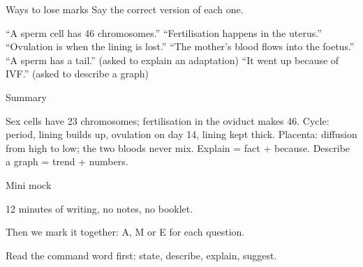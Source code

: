 \documentclass[aspectratio=169,11pt,xcolor=table]{beamer}
\begin{document}
\begin{frame}{Ways to lose marks}
\relax
Say the correct version of each one.\par\vspace{1mm}
 ``A sperm cell has 46 chromosomes.''
 ``Fertilisation happens in the uterus.''
 ``Ovulation is when the lining is lost.''
 ``The mother's blood flows into the foetus.''
 ``A sperm has a tail.'' (asked to explain an adaptation)
 ``It went up because of IVF.'' (asked to describe a graph)
\end{frame}

\begin{frame}{Summary}
\relax
\vspace{2mm}
{\sSum
{} Sex cells have 23 chromosomes; fertilisation in the oviduct makes 46.
 Cycle: period, lining builds up, ovulation on day 14, lining kept thick.
 Placenta: diffusion from high to low; the two bloods never mix.
 Explain = fact + because. Describe a graph = trend + numbers.\par}
\end{frame}

\begin{frame}{Mini mock}
\relax
\vspace{4mm}
\par\vspace{4mm}
12 minutes of writing, no notes, no booklet.\par\vspace{2mm}
Then we mark it together: A, M or E for each question.\par\vspace{5mm}
Read the command word first: state, describe, explain, suggest.
\end{frame}
\end{document}
